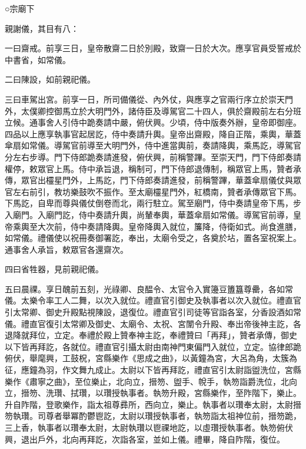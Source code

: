 
\begin{pinyinscope}

 ○宗廟下



 親謝儀，其目有八：



 一曰齋戒。前享三日，皇帝散齋二日於別殿，致齋一日於大次。應享官員受誓戒於中書省，如常儀。



 二曰陳設，如前親祀儀。



 三曰車駕出宮。前享一日，所司備儀從、內外仗，與應享之官兩行序立於崇天門外，太僕卿控御馬立於大明門外，諸侍臣及導駕官二十四人，俱於齋殿前左右分班立候。通事舍人引侍中跪奏請中嚴，俯伏興。少頃，侍中版奏外辦，皇帝即御座。四品以上應享執事官起居訖，侍中奏請升輿。皇帝出齋殿，降自正階，乘輿，華蓋傘扇如常儀。導駕官前導至大明門外，侍中進當輿前，奏請降輿，乘馬訖，導駕官分左右步導。門下侍郎跪奏請進發，俯伏興，前稱警蹕。至崇天門，門下侍郎奏請權停，敕眾官上馬。侍中承旨退，稱制可，門下侍郎退傳制，稱眾官上馬，贊者承傳，眾官出欞星門外，上馬訖，門下侍郎奏請進發，前稱警蹕，華蓋傘扇儀仗與眾官左右前引，教坊樂鼓吹不振作。至太廟欞星門外，紅橋南，贊者承傳眾官下馬。下馬訖，自卑而尊與儀仗倒卷而北，兩行駐立。駕至廟門，侍中奏請皇帝下馬，步入廟門。入廟門訖，侍中奏請升輿，尚輦奉輿，華蓋傘扇如常儀。導駕官前導，皇帝乘輿至大次前，侍中奏請降輿。皇帝降輿入就位，簾降，侍衛如式。尚食進膳，如常儀。禮儀使以祝冊奏御署訖，奉出，太廟令受之，各奠於坫，置各室祝案上。通事舍人承旨，敕眾官各還齋次。



 四曰省牲器，見前親祀儀。



 五曰晨祼。享日醜前五刻，光祿卿、良醖令、太官令入實籩豆簠簋尊罍，各如常儀。太樂令率工人二舞，以次入就位。禮直官引御史及執事者以次入就位。禮直官引太常卿、御史升殿點視陳設，退復位。禮直官引司徒等官詣各室，分香設酒如常儀。禮直官復引太常卿及御史、太廟令、太祝、宮闈令升殿、奉出帝後神主訖，各退降就拜位，立定。奉禮於殿上贊奉神主訖，奉禮贊曰「再拜」，贊者承傳，御史以下皆再拜訖，各就位。禮直官引攝太尉由南神門東偏門入就位，立定。協律郎跪俯伏，舉麾興，工鼓柷，宮縣樂作《思成之曲》，以黃鐘為宮，大呂為角，太簇為征，應鐘為羽，作文舞九成止。太尉以下皆再拜訖，禮直官引太尉詣盥洗位，宮縣樂作《肅寧之曲》，至位樂止，北向立，搢笏、盥手、帨手，執笏詣爵洗位，北向立，搢笏、洗瓚、拭瓚，以瓚授執事者。執笏升殿，宮縣樂作，至阼階下，樂止。升自阼階，登歌樂作，詣太祖尊彞所，西向立，樂止。執事者以瓚奉太尉，太尉搢笏執瓚。司尊者舉冪酌鬱鬯訖，太尉以瓚授執事者，執笏詣太祖神位前，搢笏跪，三上香，執事者以瓚奉太尉，太尉執瓚以鬯祼地訖，以虛瓚授執事者。執笏俯伏興，退出戶外，北向再拜訖，次詣各室，並如上儀。禮畢，降自阼階，復位。




\end{pinyinscope}
